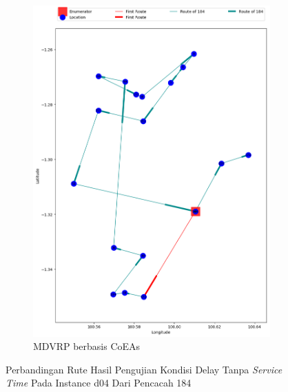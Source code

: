 \begin{figure}[H]
	\centering
	\begin{subfigure}[t]{\textwidth}
		\centering
		\includegraphics[width=\textwidth]{Resources/Images/delayed_4/real_m15_n100_delayed_4_184_coes}
		\caption{MDVRP berbasis CoEAs}
		\label{fig:real_m15_n100_delayed_4_184_coes}
	\end{subfigure}
	\caption{Perbandingan Rute Hasil Pengujian Kondisi Delay Tanpa \textit{Service Time} Pada Instance d04 Dari Pencacah 184}
	\label{fig:real_m15_n100_delayed_4_184}
\end{figure}



